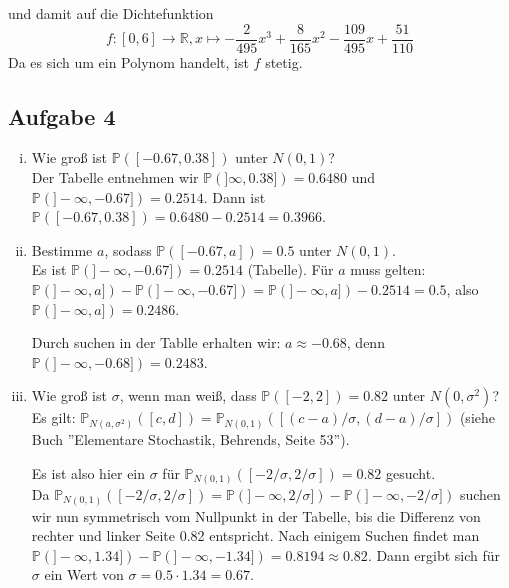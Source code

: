 \documentclass[11pt,a4paper,ngerman]{article}
\newcommand{\Prob}{\mathbb{P}}
\begin{document}
und damit auf die Dichtefunktion 
\begin{equation*}
f: [0,6] \to \mathbb{R}, x \mapsto  -\frac{2}{495} x^3 +  \frac{8}{165} x^2 - \frac{109}{495}x +  \frac{51}{110}
\end{equation*}
Da es sich um ein Polynom handelt, ist $f$ stetig.
\subsection*{Aufgabe 4}

\begin{enumerate}[i)]
\item Wie groß ist $\Prob([-0.67,0.38])$ unter $N(0,1)$? \\
Der Tabelle entnehmen wir $\Prob(]\infty, 0.38]) =0.6480 $ und $\Prob(]-\infty,-0.67]) =  0.2514$.
Dann ist  $\Prob([-0.67,0.38]) = 0.6480 -  0.2514 = 0.3966$.
\item Bestimme $a$, sodass $\Prob([-0.67, a]) = 0.5$ unter $N(0,1)$.\\
Es ist   $\Prob(]-\infty,-0.67]) =  0.2514$ (Tabelle). Für $a$ muss gelten: \\
$\Prob(]-\infty, a]) - \Prob(]-\infty,-0.67])  = \Prob(]-\infty, a]) -  0.2514=  0.5$, also $\Prob(]-\infty, a]) = 0.2486$.

Durch suchen in der Tablle erhalten wir: $a \approx -0.68$, denn $\Prob(]-\infty,-0.68]) =  0.2483$.

\item Wie groß ist $\sigma$, wenn man weiß, dass $\Prob([-2,2]) = 0.82$ unter $N(0,\sigma^2)$?\\
Es gilt: $\Prob_{N(a,\sigma^2)}([c,d]) = \Prob_{N(0,1)}([(c-a)/\sigma, (d-a)/ \sigma])$  (siehe Buch ''Elementare Stochastik, Behrends, Seite 53'').

Es ist also hier ein $\sigma$ für $\Prob_{N(0,1)}([-2/\sigma, 2/ \sigma]) = 0.82$ gesucht. \\
Da  $\Prob_{N(0,1)}([-2/\sigma, 2/ \sigma]) =   \Prob(]-\infty, 2/ \sigma]) -  \Prob(]-\infty, - 2/ \sigma])$ suchen wir nun symmetrisch vom Nullpunkt in der Tabelle,
bis die Differenz von rechter und linker Seite 0.82 entspricht. Nach einigem Suchen findet man  $\Prob(]-\infty, 1.34]) -  \Prob(]-\infty, -1.34]) = 0.8194 \approx 0.82$.
Dann ergibt sich für $\sigma$ ein Wert von $\sigma = 0.5 \cdot 1.34 = 0.67$.
\end{enumerate}


\label{LastPage}
\end{document}
